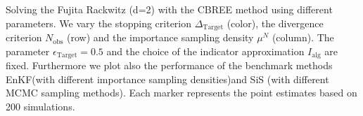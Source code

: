 Solving the Fujita Rackwitz (d=2) with the CBREE method using  different parameters. We vary the stopping criterion $\Delta_{\text{Target}}$ (color), the divergence criterion $N_\text{obs}$ (row) and the importance sampling density $\mu^N$ (column). The parameter $\epsilon_{\text{Target}} = 0.5$ and the choice of the indicator approximation $I_\text{alg}$ are fixed. Furthermore we plot also the performance of the benchmark methods EnKF(with different importance sampling densities)and SiS (with different MCMC sampling methods). Each marker represents the point estimates based on 200 simulations.